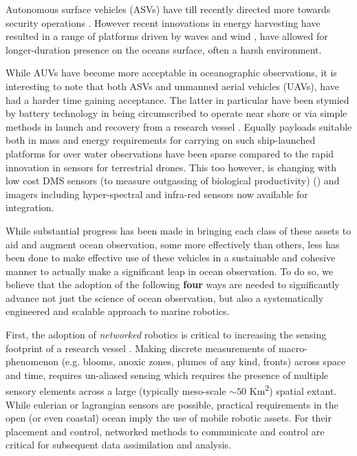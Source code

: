 Autonomous surface vehicles (ASVs) have till recently directed more
towards security operations \cite{wolf10}. However recent innovations
in energy harvesting have resulted in a range of platforms driven by
waves \cite{waveglider,verfuss19} and wind \cite{gentemann20,ghani14},
have allowed for longer-duration presence on the oceans surface, often
a harsh environment.

While AUVs have become more acceptable in oceanographic observations,
it is interesting to note that both ASVs and unmanned aerial vehicles
(UAVs), have had a harder time gaining acceptance. The latter in
particular have been stymied by battery technology in being
circumscribed to operate near shore or via simple methods in launch
and recovery from a research vessel \cite{Ferreira2018}. Equally
payloads suitable both in mass and energy requirements for carrying on
such ship-launched platforms for over water observations have been
sparse compared to the rapid innovation in sensors for terrestrial
drones. This too however, is changing with low cost DMS sensors (to
measure outgassing of biological productivity) (\cite{pinto21}) and
imagers including hyper-spectral \cite{sigernes18} and infra-red
sensors now available for integration.

While substantial progress has been made in bringing each class of
these assets to aid and augment ocean observation, some more
effectively than others, less has been done to make effective use of
these vehicles in a sustainable and cohesive manner to actually make a
significant leap in ocean observation. To do so, we believe that the
adoption of the following \textbf{four} ways are needed to
significantly advance not just the science of ocean observation, but
also a systematically engineered and scalable approach to marine
robotics.

First, the adoption of \emph{networked} robotics is critical to
increasing the sensing footprint of a research vessel
\cite{lima21}. Making discrete measurements of macro-phenomenon
(e.g. blooms, anoxic zones, plumes of any kind, fronts) across space
and time, requires un-aliased sensing which requires the presence of
multiple sensory elements across a large (typically meso-scale
$\sim 50$ Km\textsuperscript{2}) spatial extant. While eulerian or
lagrangian sensors are possible, practical requirements in the open
(or even coastal) ocean imply the use of mobile robotic assets. For
their placement and control, networked methods to communicate and
control are critical for subsequent data assimilation and analysis.

